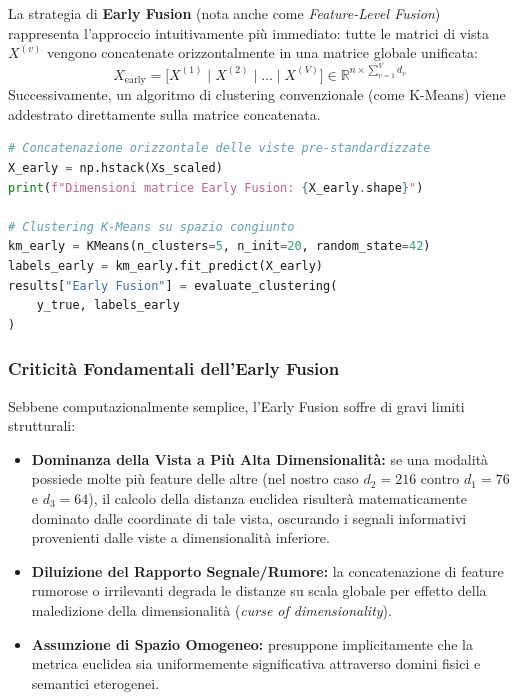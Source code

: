La strategia di \textbf{Early Fusion} (nota anche come \textit{Feature-Level Fusion}) rappresenta l'approccio intuitivamente più immediato: tutte le matrici di vista $X^{(v)}$ vengono concatenate orizzontalmente in una matrice globale unificata:
\begin{equation}
    X_{\text{early}} = \big[ X^{(1)} \mid X^{(2)} \mid \dots \mid X^{(V)} \big] \in \mathbb{R}^{n \times \sum_{v=1}^V d_v}
\end{equation}
Successivamente, un algoritmo di clustering convenzionale (come K-Means) viene addestrato direttamente sulla matrice concatenata.

\begin{lstlisting}[language=Python, caption={Implementazione di Early Fusion con concatenazione e K-Means.}]
# Concatenazione orizzontale delle viste pre-standardizzate
X_early = np.hstack(Xs_scaled)
print(f"Dimensioni matrice Early Fusion: {X_early.shape}")

# Clustering K-Means su spazio congiunto
km_early = KMeans(n_clusters=5, n_init=20, random_state=42)
labels_early = km_early.fit_predict(X_early)
results["Early Fusion"] = evaluate_clustering(
    y_true, labels_early
)
\end{lstlisting}

\subsubsection{Criticità Fondamentali dell'Early Fusion}
Sebbene computazionalmente semplice, l'Early Fusion soffre di gravi limiti strutturali:
\begin{itemize}
    \item \textbf{Dominanza della Vista a Più Alta Dimensionalità:} se una modalità possiede molte più feature delle altre (nel nostro caso $d_2 = 216$ contro $d_1 = 76$ e $d_3 = 64$), il calcolo della distanza euclidea risulterà matematicamente dominato dalle coordinate di tale vista, oscurando i segnali informativi provenienti dalle viste a dimensionalità inferiore.
    \item \textbf{Diluizione del Rapporto Segnale/Rumore:} la concatenazione di feature rumorose o irrilevanti degrada le distanze su scala globale per effetto della maledizione della dimensionalità (\textit{curse of dimensionality}).
    \item \textbf{Assunzione di Spazio Omogeneo:} presuppone implicitamente che la metrica euclidea sia uniformemente significativa attraverso domini fisici e semantici eterogenei.
\end{itemize}

